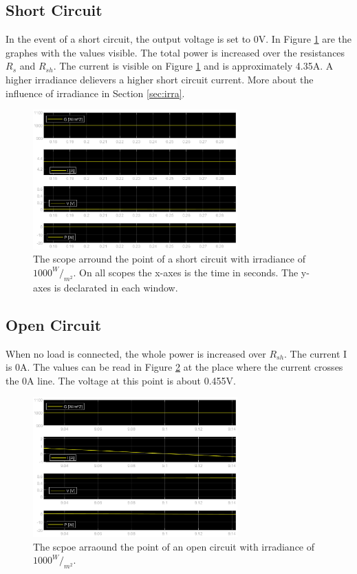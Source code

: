 \newpage
	
	\subsection{Short Circuit}
	In the event of a short circuit, the output voltage is set to 0V. In Figure \ref{fig:shortc} are the graphes with the values visible.
	The total power is increased over the resistances $R_s$ and $R_{sh}$. The current is visible on Figure \ref{fig:shortc} and is approximately 4.35A. A higher irradiance delievers a higher short circuit current. More about the influence of irradiance in Section \ref{sec:irra}.
	
		\begin{figure}[H]
			\centering
			\includegraphics[width=0.7\textwidth]{figures/shortcircuit.eps}
			\caption[The scope arround the point of a short circuit with irradiance  of $1000^W/_{m^2}$.]{The scope arround the point of a short circuit with irradiance  of $1000^W/_{m^2}$. On all scopes the x-axes is the time in seconds. The y-axes is declarated in each window.}
			\label{fig:shortc}
		\end{figure}
	
	\subsection{Open Circuit}
	When no load is connected, the whole power is increased over $R_{sh}$. The current I is 0A. The values can be read in Figure \ref{fig:openc} at the place where the current crosses the 0A line. The voltage at this point is about 0.455V.
		
		\begin{figure}[H]
			\centering
			\includegraphics[width=0.7\textwidth]{figures/opencircuit.eps}
			\caption{The scpoe arraound the point of an open circuit with irradiance  of $1000^W/_{m^2}$.}
			\label{fig:openc}
		\end{figure}
	
